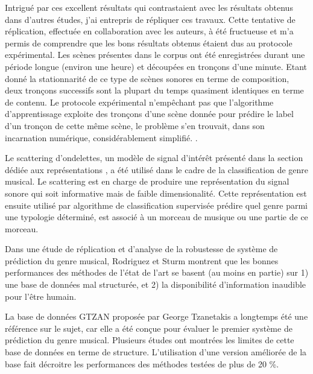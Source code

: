   Intrigué par ces excellent résultats qui contrastaient avec les résultats obtenus dans d'autres études, j'ai entrepris de répliquer ces travaux. Cette tentative de réplication, effectuée en collaboration avec les auteurs, à été fructueuse et m'a permis de comprendre que les bons résultats obtenus étaient dus au protocole expérimental\cite{lagrange2015}. Les scènes présentes dans le corpus ont été enregistrées durant une période longue (environ une heure) et découpées en tronçons d'une minute. Etant donné la stationnarité de ce type de scènes sonores en terme de composition, deux tronçons successifs sont la plupart du temps quasiment identiques en terme de contenu. Le protocole expérimental n'empêchant pas que l'algorithme d'apprentissage exploite des tronçons d'une scène donnée pour prédire le label d'un tronçon de cette même scène, le problème s'en trouvait, dans son incarnation numérique, considérablement simplifié. .

  Le scattering d'ondelettes, un modèle de signal d'intérêt présenté dans la section dédiée aux représentations , a été utilisé dans le cadre de la classification de genre musical. Le scattering est en charge de produire une représentation du signal sonore qui soit informative mais de faible dimensionalité. Cette représentation est ensuite utilisé par algorithme de classification supervisée prédire quel genre parmi une typologie déterminé, est associé à un morceau de musique ou une partie de ce morceau.

  Dans une étude de réplication et d'analyse de la robustesse de système de prédiction du genre musical\cite{rodriguez2016analysing}, Rodriguez et Sturm montrent que les bonnes performances des méthodes de l'état de l'art se basent (au moins en partie) sur 1) une base de données mal structurée, et 2) la disponibilité d'information inaudible pour l'être humain.

  La base de données GTZAN proposée par George Tzanetakis a longtemps été une référence sur le sujet, car elle a été conçue pour évaluer le premier système de prédiction du genre musical\cite{tzanetakis2002musical}. Plusieurs études ont montrées les limites de cette base de données en terme de structure. L'utilisation d'une version améliorée de la base fait décroitre les performances des méthodes testées de plus de 20 \%.

